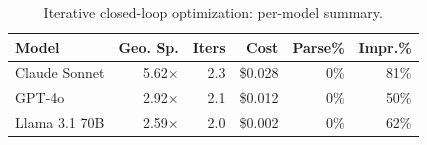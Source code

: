 \begin{table}[t]
\caption{Iterative closed-loop optimization: per-model summary.}
\label{tab:iterative_models}
\centering\small
\begin{tabular}{lrrrrr}
\toprule
\textbf{Model} & \textbf{Geo. Sp.} & \textbf{Iters} & \textbf{Cost} & \textbf{Parse\%} & \textbf{Impr.\%} \\
\midrule
Claude Sonnet & 5.62$\times$ & 2.3 & \$0.028 & 0\% & 81\% \\
GPT-4o & 2.92$\times$ & 2.1 & \$0.012 & 0\% & 50\% \\
Llama 3.1 70B & 2.59$\times$ & 2.0 & \$0.002 & 0\% & 62\% \\
\bottomrule
\end{tabular}
\end{table}